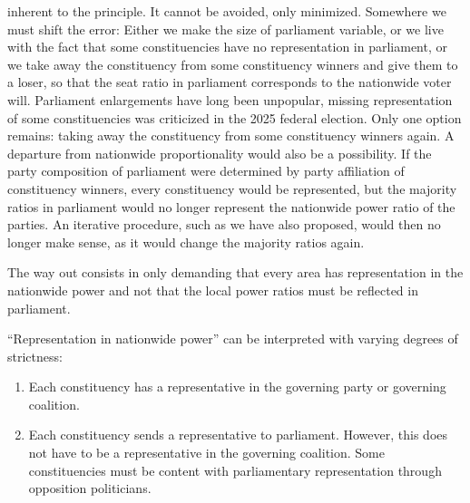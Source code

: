 inherent to the principle. It cannot be avoided, only minimized. Somewhere we must
shift the error: Either we make the size of parliament variable, or we live with the fact that
some constituencies have no representation in parliament, or we take away the constituency from some
constituency winners and give them to a loser, so that the seat ratio in
parliament corresponds to the nationwide voter will. Parliament enlargements have long been
unpopular, missing representation of some constituencies was criticized in the 2025 federal election.
Only one option remains: taking away the constituency from some constituency winners again.
A departure from nationwide proportionality would also be a possibility. If the
party composition of parliament were determined by party affiliation of constituency winners,
every constituency would be represented, but the majority ratios in parliament would
no longer represent the nationwide power ratio of the parties. An iterative
procedure, such as we have also proposed, would then no longer make sense, as it
would change the majority ratios again.

The way out consists in only demanding that every area has representation in the
nationwide power and not that the local power ratios must be
reflected in parliament.

\enquote{Representation in nationwide power} can be interpreted with varying degrees of strictness:
\begin{enumerate}[label=\alph*)]
  \item Each constituency has a representative in the governing party or
    governing coalition.
  \item Each constituency sends a representative to parliament. However, this does not have to be a
    representative in the governing coalition. Some constituencies must be content with
    parliamentary representation through opposition politicians.
\end{enumerate}

